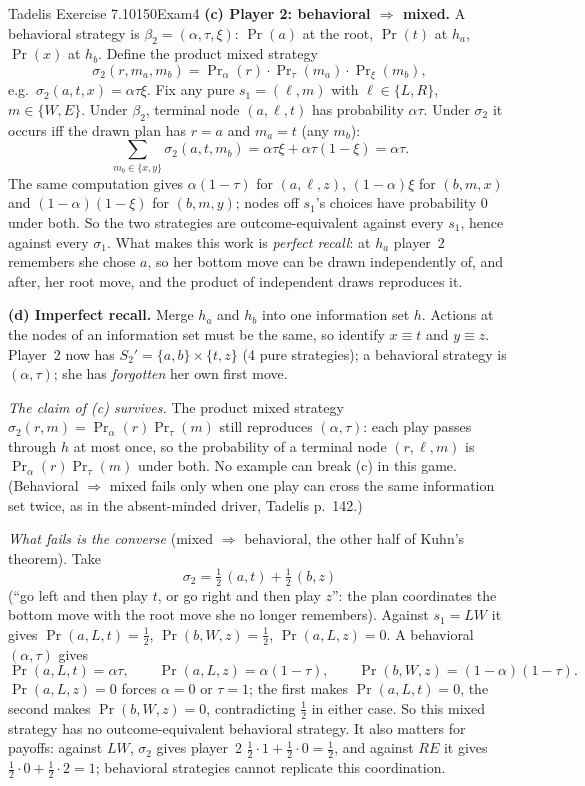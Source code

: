 \begin{exsol}{Tadelis Exercise 7.10}{150}{Exam}{4}
\textbf{(c) Player 2: behavioral $\Rightarrow$ mixed.} A behavioral strategy is $\beta_2 = (\alpha,
\tau, \xi)$: $\Pr(a)$ at the root, $\Pr(t)$ at $h_a$, $\Pr(x)$ at $h_b$. Define the product mixed
strategy
\[
  \sigma_2(r, m_a, m_b) = \Pr\nolimits_\alpha(r)\cdot \Pr\nolimits_\tau(m_a) \cdot \Pr\nolimits_\xi(m_b),
\]
e.g.\ $\sigma_2(a,t,x) = \alpha\tau\xi$. Fix any pure $s_1 = (\ell, m)$ with $\ell \in \{L,R\}$,
$m \in \{W,E\}$. Under $\beta_2$, terminal node $(a, \ell, t)$ has probability $\alpha\tau$. Under
$\sigma_2$ it occurs iff the drawn plan has $r = a$ and $m_a = t$ (any $m_b$):
\[
  \sum_{m_b \in\{x,y\}} \sigma_2(a, t, m_b) = \alpha\tau\xi + \alpha\tau(1-\xi) = \alpha\tau .
\]
The same computation gives $\alpha(1-\tau)$ for $(a, \ell, z)$, $(1-\alpha)\xi$ for $(b, m, x)$ and
$(1-\alpha)(1-\xi)$ for $(b, m, y)$; nodes off $s_1$'s choices have probability 0 under both.
So the two strategies are outcome-equivalent against every $s_1$, hence against every $\sigma_1$.
What makes this work is \emph{perfect recall}: at $h_a$ player~2 remembers she chose $a$, so her
bottom move can be drawn independently of, and after, her root move, and the product of independent
draws reproduces it.

\textbf{(d) Imperfect recall.} Merge $h_a$ and $h_b$ into one information set $h$. Actions at the
nodes of an information set must be the same, so identify $x \equiv t$ and $y \equiv z$. Player~2
now has $S_2' = \{a, b\} \times \{t, z\}$ (4 pure strategies); a behavioral strategy is $(\alpha,
\tau)$; she has \emph{forgotten} her own first move.

\emph{The claim of (c) survives.} The product mixed strategy $\sigma_2(r, m) = \Pr_\alpha(r)
\Pr_\tau(m)$ still reproduces $(\alpha, \tau)$: each play passes through $h$ at most once, so the
probability of a terminal node $(r, \ell, m)$ is $\Pr_\alpha(r)\Pr_\tau(m)$ under both. No example
can break (c) in this game. (Behavioral $\Rightarrow$ mixed fails only when one play can cross the
same information set twice, as in the absent-minded driver, Tadelis p.~142.)

\emph{What fails is the converse} (mixed $\Rightarrow$ behavioral, the other half of Kuhn's
theorem). Take
\[
  \sigma_2 = \tfrac12\,(a, t) + \tfrac12\,(b, z)
\]
(``go left and then play $t$, or go right and then play $z$'': the plan coordinates the bottom move
with the root move she no longer remembers). Against $s_1 = LW$ it gives $\Pr(a,L,t) = \frac12$,
$\Pr(b,W,z) = \frac12$, $\Pr(a,L,z) = 0$. A behavioral $(\alpha, \tau)$ gives
\[
  \Pr(a, L, t) = \alpha\tau, \qquad \Pr(a, L, z) = \alpha(1 - \tau), \qquad
  \Pr(b, W, z) = (1-\alpha)(1-\tau).
\]
$\Pr(a,L,z) = 0$ forces $\alpha = 0$ or $\tau = 1$; the first makes $\Pr(a,L,t) = 0$, the second
makes $\Pr(b,W,z) = 0$, contradicting $\frac12$ in either case. So this mixed strategy has no
outcome-equivalent behavioral strategy. It also matters for payoffs: against $LW$, $\sigma_2$ gives
player~2 $\frac12 \cdot 1 + \frac12 \cdot 0 = \frac12$, and against $RE$ it gives $\frac12\cdot 0 +
\frac12 \cdot 2 = 1$; behavioral strategies cannot replicate this coordination.


\end{exsol}

